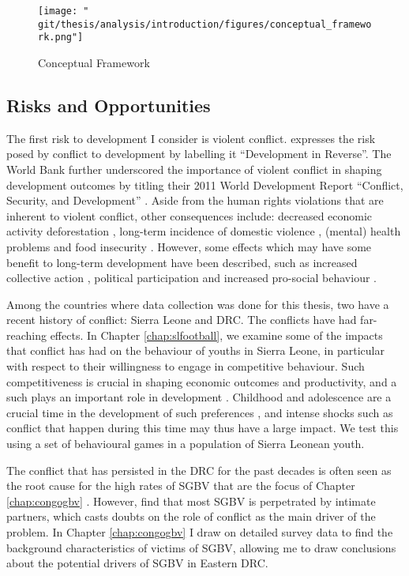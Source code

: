 \begin{figure}[htb]
  \centering
  \texttt{[image: "\\git/thesis/analysis/introduction/figures/conceptual\_framework.png"]}
  \caption{Conceptual Framework}
  \label{intro:fig:framework}
\end{figure}

\subsection{Risks and Opportunities}
The first risk to development I consider is violent conflict. \citet{Collier2003}  expresses the risk posed by conflict to development by labelling it ``Development in Reverse''. The World Bank further underscored the importance of violent conflict in shaping development outcomes by titling their 2011 World Development Report ``Conflict, Security, and Development'' \citep{WorldBank2011}. Aside from the human rights violations that are inherent to violent conflict, other consequences include: decreased economic activity \citep{Collier1999} deforestation \cite[e.g.][]{Connectiona}, long-term incidence of domestic violence \citep[e.g.][]{LaMattina2017, Muller2019}, (mental) health problems \cite[e.g.][]{Smith2002, Iqbal2006a,Akresh2011} and food insecurity \cite[e.g.][]{Lecoutere2005, Verwimp2012}. However, some effects which may have some benefit to long-term development have been described, such as increased collective action \citep{Bellows2009b}, political participation \citep{Blattman2009a} and increased pro-social behaviour \citep{Voors2012a}.

Among the countries where data collection was done for this thesis, two have a recent history of conflict: Sierra Leone and DRC. The conflicts have had far-reaching effects. In Chapter \ref{chap:slfootball}, we examine some of the impacts that conflict has had on the behaviour of youths in Sierra Leone, in particular with respect to their willingness to engage in competitive behaviour. Such competitiveness is crucial in shaping economic outcomes and productivity, and a such plays an important role in development \citep{Niederle2007}. Childhood and adolescence are a crucial time in the development of such preferences \citep{Benenson2007,Fehr2008,Sutter2007a}, and intense shocks such as conflict that happen during this time may thus have a large impact. We test this using a set of behavioural games in a population of Sierra Leonean youth.

The conflict that has persisted in the DRC for the past decades is often seen as the root cause for the high rates of SGBV that are the focus of Chapter \ref{chap:congogbv} \citep{Baaz2013,Kirby2015,Johnson2010}. However, \cite{Peterman2011} find that most SGBV is perpetrated by intimate partners, which casts doubts on the role of conflict as the main driver of the problem. In Chapter \ref{chap:congogbv} I draw on detailed survey data to find the background characteristics of victims of SGBV, allowing me to draw conclusions about the potential drivers of SGBV in Eastern DRC.

